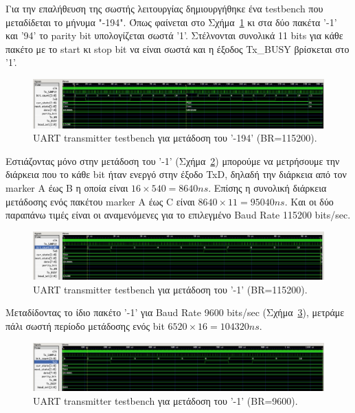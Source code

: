 \documentclass[../main.tex]{subfiles}
\begin{document}
Για την επαλήθευση της σωστής λειτουργίας δημιουργήθηκε ένα testbench που
μεταδίδεται το μήνυμα "-194". Όπως φαίνεται στο
Σχήμα~\ref{fig:transmitter_tb_zoomed_out} κι στα δύο πακέτα '-1' και '94' το
parity bit υπολογίζεται σωστά '1'. Στέλνονται συνολικά 11 bits για κάθε πακέτο
με το start κι stop bit να είναι σωστά και η έξοδος Tx\_BUSY βρίσκεται στο '1'.

\begin{figure}[H]
  \begin{center}
    \includegraphics[width=\textwidth]{../images/transmitter_tb_zoomed_out.png}
  \end{center}
  \caption{UART transmitter testbench για μετάδοση του '-194' (BR=115200).}
  \label{fig:transmitter_tb_zoomed_out}
\end{figure}

Εστιάζοντας μόνο στην μετάδοση του '-1' (Σχήμα~\ref{fig:transmitter_tb})
μπορούμε να μετρήσουμε την διάρκεια που το κάθε bit ήταν ενεργό στην έξοδο TxD,
δηλαδή την διάρκεια από τον marker A έως B η οποία είναι $16\times540=8640ns$.
Επίσης η συνολική διάρκεια μετάδοσης ενός πακέτου marker A έως C είναι
$8640\times11=95040ns$. Και οι δύο παραπάνω τιμές είναι οι αναμενόμενες για το
επιλεγμένο Baud Rate 115200 bits/sec.

\begin{figure}[H]
  \begin{center}
    \includegraphics[width=\textwidth]{../images/transmitter_tb.png}
  \end{center}
  \caption{UART transmitter testbench για μετάδοση του '-1' (BR=115200).}
  \label{fig:transmitter_tb}
\end{figure}

Μεταδίδοντας το ίδιο πακέτο '-1' για Baud Rate 9600 bits/sec
(Σχήμα~\ref{fig:transmitter_tb_9600}), μετράμε πάλι σωστή περίοδο μετάδοσης ενός
bit $6520\times16=104320ns$.

\begin{figure}[H]
  \begin{center}
    \includegraphics[width=\textwidth]{../images/transmitter_tb_9600.png}
  \end{center}
  \caption{UART transmitter testbench για μετάδοση του '-1' (BR=9600).}
  \label{fig:transmitter_tb_9600}
\end{figure}
\end{document}
